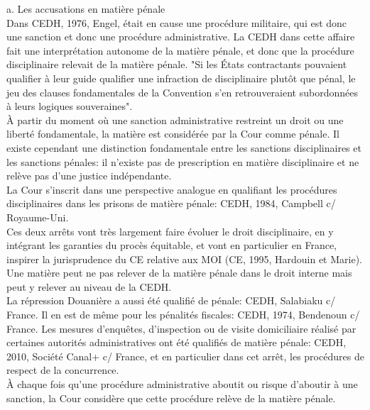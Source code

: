 \documentclass[10pt, a4paper, openany]{book}
\begin{document}
a. Les accusations en matière pénale \\
Dans CEDH, 1976, Engel, était en cause une procédure militaire, qui est donc une sanction et donc une procédure administrative. La CEDH dans cette affaire fait une interprétation autonome de la matière pénale, et donc que la procédure disciplinaire relevait de la matière pénale. "Si les États contractants pouvaient qualifier à leur guide qualifier une infraction de disciplinaire plutôt que pénal, le jeu des clauses fondamentales de la Convention s'en retrouveraient subordonnées à leurs logiques souveraines". \\
À partir du moment où une sanction administrative restreint un droit ou une liberté fondamentale, la matière est considérée par la Cour comme pénale. Il existe cependant une distinction fondamentale entre les sanctions disciplinaires et les sanctions pénales: il n'existe pas de prescription en matière disciplinaire et ne relève pas d'une justice indépendante. \\
La Cour s'inscrit dans une perspective analogue en qualifiant les procédures disciplinaires dans les prisons de matière pénale: CEDH, 1984, Campbell c/ Royaume-Uni. \\
Ces deux arrêts vont très largement faire évoluer le droit disciplinaire, en y intégrant les garanties du procès équitable, et vont en particulier en France, inspirer la jurisprudence du CE relative aux MOI (CE, 1995, Hardouin et Marie). \\
Une matière peut ne pas relever de la matière pénale dans le droit interne mais peut y relever au niveau de la CEDH. \\
La répression Douanière a aussi été qualifié de pénale: CEDH, Salabiaku c/ France. Il en est de même pour les pénalités fiscales: CEDH, 1974, Bendenoun c/ France. Les mesures d'enquêtes, d'inspection ou de visite domiciliaire réalisé par certaines autorités administratives ont été qualifiés de matière pénale: CEDH, 2010, Société Canal+ c/ France, et en particulier dans cet arrêt, les procédures de respect de la concurrence. \\
À chaque fois qu'une procédure administrative aboutit ou risque d'aboutir à une sanction, la Cour considère que cette procédure relève de la matière pénale.  
\end{document}
